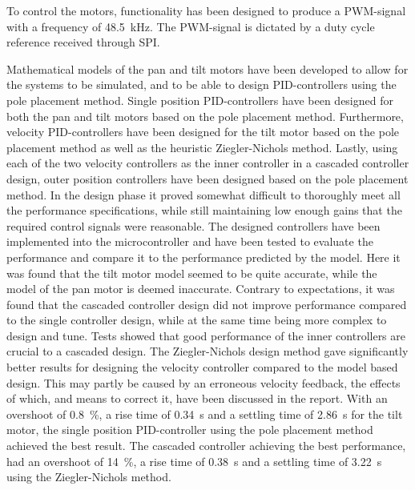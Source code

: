 \documentclass[../../main.tex]{subfiles}
\begin{document}
To control the motors, functionality has been designed to produce a PWM-signal with a frequency of \SI{48.5}{\kilo\hertz}. The PWM-signal is dictated by a duty cycle reference received through SPI.

Mathematical models of the pan and tilt motors have been developed to allow for the systems to be simulated, and to be able to design PID-controllers using the pole placement method.
Single position PID-controllers have been designed for both the pan and tilt motors based on the pole placement method. Furthermore, velocity PID-controllers have been designed for the tilt motor based on the pole placement method as well as the heuristic Ziegler-Nichols method. Lastly, using each of the two velocity controllers as the inner controller in a cascaded controller design, outer position controllers have been designed based on the pole placement method. In the design phase it proved somewhat difficult to thoroughly meet all the performance specifications, while still maintaining low enough gains that the required control signals were reasonable.
The designed controllers have been implemented into the microcontroller and have been tested to evaluate the performance and compare it to the performance predicted by the model.
Here it was found that the tilt motor model seemed to be quite accurate, while the model of the pan motor is deemed inaccurate.
Contrary to expectations, it was found that the cascaded controller design did not improve performance compared to the single controller design, while at the same time being more complex to design and tune.
Tests showed that good performance of the inner controllers are crucial to a cascaded design. The Ziegler-Nichols design method gave significantly better results for designing the velocity controller compared to the model based design. This may partly be caused by an erroneous velocity feedback, the effects of which, and means to correct it, have been discussed in the report.
With an overshoot of \SI{0,8}{\percent}, a rise time of \SI{0,34}{\second} and a settling time of \SI{2,86}{\second} for the tilt motor, the single position PID-controller using the pole placement method achieved the best result.
The cascaded controller achieving the best performance, had an overshoot of \SI{14}{\percent}, a rise time of \SI{0,38}{\second} and a settling time of \SI{3,22}{\second} using the Ziegler-Nichols method. 
\end{document}

